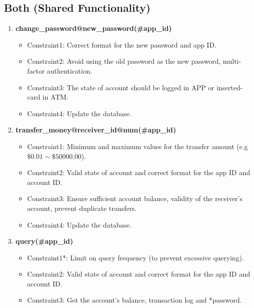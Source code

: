 \documentclass[12pt]{article}
\begin{document}
\subsection{Both (Shared Functionality)}

\begin{enumerate}
    \item \textbf{change\_password@new\_password(\#app\_id)}
        \begin{itemize}
            \item Constraint1: Correct format for the new password and app ID.
            \item Constraint2: Avoid using the old password as the new password, multi-factor authentication.
            \item Constraint3: The state of account should be logged in APP or inserted-card in ATM.
            \item Constraint4: Update the database.
        \end{itemize}
        
    \item \textbf{transfer\_money@receiver\_id@num(\#app\_id)}
        \begin{itemize}
            \item Constraint1: Minimum and maximum values for the transfer amount (e.g $ \$0.01\sim \$50000.00$).
            \item Constraint2: Valid state of account and correct format for the app ID and account ID.
            \item Constraint3: Ensure sufficient account balance, validity of the receiver's account, prevent duplicate transfers.
            \item Constraint4: Update the database.
        \end{itemize}
        
    \item \textbf{query(\#app\_id)}
        \begin{itemize}
            \item Constraint1*: Limit on query frequency (to prevent excessive querying).
            \item Constraint2: Valid state of account and correct format for the app ID and account ID.
            \item Constraint3: Get the account's balance, transaction log and *password.
        \end{itemize}
\end{enumerate}
\end{document}
